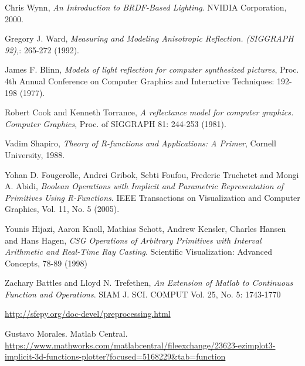 \documentclass[11pt]{amsart}
\theoremstyle{definition}
\begin{document}
\begin{thebibliography}{9}
Chris Wynn,
\emph{An Introduction to BRDF-Based Lighting}.
NVIDIA Corporation, 2000.

Gregory J. Ward, 
\emph{Measuring and Modeling Anisotropic Reflection. (SIGGRAPH 92),}: 265-272 (1992).

James F. Blinn,  
\emph{Models of light reflection for computer synthesized pictures}, Proc. 4th
Annual Conference on Computer Graphics and Interactive Techniques: 192-198
(1977). 

Robert Cook and Kenneth Torrance,
\emph{A reflectance model for computer graphics. Computer Graphics}, Proc. of SIGGRAPH 81: 244-253 (1981).  

Vadim Shapiro,
\emph{Theory of R-functions and Applications: A Primer}, Cornell University, 1988.

Yohan D. Fougerolle, Andrei Gribok, Sebti Foufou, Frederic Truchetet and Mongi A. Abidi,
\emph{Boolean Operations with Implicit and Parametric Representation of Primitives Using R-Functions}.
IEEE Transactions on Visualization and Computer Graphics, Vol. 11, No. 5 (2005).

Younis Hijazi, Aaron Knoll, Mathias Schott, Andrew Kensler, Charles Hansen and Hans Hagen,
\emph{CSG Operations of Arbitrary Primitives with Interval Arithmetic and Real-Time Ray Casting}.
Scientific Visualization: Advanced Concepts, 78-89 (1998) 
	
 
  Zachary Battles and Lloyd N. Trefethen,
  \emph{An Extension of Matlab to Continuous Function and Operations}.
  SIAM J. SCI. COMPUT Vol. 25, No. 5: 1743-1770 
 
\url{http://sfepy.org/doc-devel/preprocessing.html}

Gustavo Morales. Matlab Central.\\
\url{https://www.mathworks.com/matlabcentral/fileexchange/23623-ezimplot3-implicit-3d-functions-plotter?focused=5168229&tab=function}


	



\end{thebibliography}


%
\end{document}
